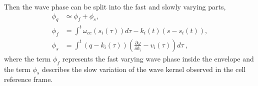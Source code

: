 Then the wave phase can be split into the fast and slowly varying parts,
\begin{equation}\label{eq.phi_fs}
    \begin{aligned}
        \phi_q & \simeq \phi_{f} + \phi_{s},
        \\
        \phi_f & = \int^{t} \omega_{ce} \left(s_{i}(\tau)\right) d \tau -k_{i}(t)\left(s-s_{i}(t)\right),
        \\
        \phi_s & = \int^{t}\left(q-k_{i}(\tau)\right)\left(\frac{\partial \omega}{\partial k_{i}}-v_{i}(\tau)\right) d \tau~,
    \end{aligned}
\end{equation}
where the term $\phi_f$ represents the fast varying wave phase inside the envelope
and the term 
$\phi_s$ describes the slow variation of the wave kernel  observed in the cell reference frame.

